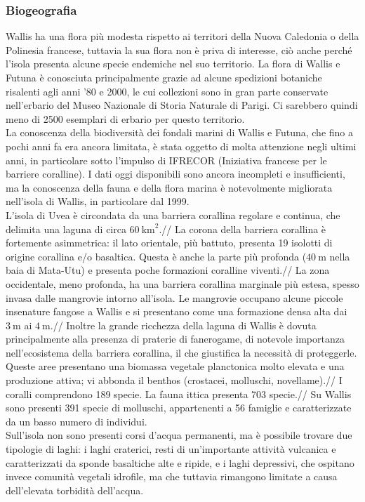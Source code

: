 \documentclass[fleqn,10pt]{SelfArx} %
\begin{document}
\subsubsection{Biogeografia}
Wallis ha una flora più modesta rispetto ai territori della Nuova Caledonia o della Polinesia francese, tuttavia la sua flora non è priva di interesse, ciò anche perché l'isola presenta alcune specie endemiche nel suo territorio. 
La flora di Wallis e Futuna è conosciuta principalmente grazie ad alcune spedizioni botaniche risalenti agli anni '80 e 2000, le cui collezioni sono in gran parte conservate nell'erbario del Museo Nazionale di Storia Naturale di Parigi. 
Ci sarebbero quindi meno di 2500 esemplari di erbario per questo territorio. \\
La conoscenza della biodiversità dei fondali marini di Wallis e Futuna, che fino a pochi anni fa era ancora limitata, è stata oggetto di molta attenzione negli ultimi anni, in particolare sotto l'impulso di IFRECOR (Iniziativa francese per le barriere coralline).
I dati oggi disponibili sono ancora incompleti e insufficienti, ma la conoscenza della fauna e della flora marina è notevolmente migliorata nell'isola di Wallis, in particolare dal 1999. \\
L'isola di Uvea è circondata da una barriera corallina regolare e continua, che delimita una laguna di circa $\SI{60}{\km\squared}$.//
La corona della barriera corallina è fortemente asimmetrica: il lato orientale, più battuto, presenta 19 isolotti di origine corallina e/o basaltica. Questa è anche la parte più profonda ($\SI{40}{\m}$ nella baia di Mata-Utu) e presenta poche formazioni coralline viventi.//
La zona occidentale, meno profonda, ha una barriera corallina marginale più estesa, spesso invasa dalle mangrovie intorno all'isola. Le mangrovie occupano alcune piccole insenature fangose a Wallis e si presentano come una formazione densa alta dai $\SI{3}{\m}$ ai $\SI{4}{\m}$.//
Inoltre la grande ricchezza della laguna di Wallis è dovuta principalmente alla presenza di praterie di fanerogame, di notevole importanza nell'ecosistema della barriera corallina, il che giustifica la necessità di proteggerle. Queste aree presentano una biomassa vegetale planctonica molto elevata e una produzione attiva; vi abbonda il benthos (crostacei, molluschi, novellame).//
I coralli comprendono 189 specie. La fauna ittica presenta 703 specie.//
Su Wallis sono presenti 391 specie di molluschi, appartenenti a 56 famiglie e caratterizzate da un basso numero di individui. \\
Sull'isola non sono presenti corsi d'acqua permanenti, ma è possibile trovare due tipologie di laghi: i laghi craterici, resti di un'importante attività vulcanica e caratterizzati da sponde basaltiche alte e ripide, e i laghi depressivi, che ospitano invece comunità vegetali idrofile, ma che tuttavia rimangono limitate a causa dell'elevata torbidità dell'acqua. \\ 
\end{document}
